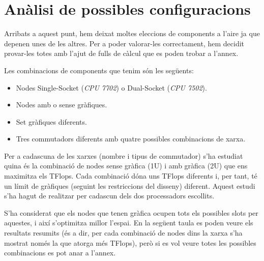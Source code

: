 \section{Anàlisi de possibles configuracions}

Arribats a aquest punt, hem deixat moltes eleccions de components a l'aire ja que depenen unes de les altres. Per a poder valorar-les correctament, hem decidit provar-les totes amb l'ajut de fulls de càlcul que es poden trobar a l'annex.

Les combinacions de components que tenim són les següents:
\begin{itemize}
    \item {Nodes Single-Socket (\textit{CPU 7702}) o Dual-Socket (\textit{CPU 7502})}.
    \item {Nodes amb o sense gràfiques}.
    \item {Set gràfiques diferents}.
    \item {Tres commutadors diferents amb quatre possibles combinacions de xarxa}.
\end{itemize}



Per a cadascuna de les xarxes (nombre i tipus de commutador) s'ha estudiat quina és la combinació de nodes sense gràfica (1U) i amb gràfica (2U) que ens maximitza els TFlops. Cada combinació dóna uns TFlops diferents i, per tant, té un límit de gràfiques (seguint les restriccions del disseny) diferent. Aquest estudi s'ha hagut de realitzar per cadascun dels dos processadors escollits.

S'ha considerat que els nodes que tenen gràfica ocupen tots els possibles slots per aquestes, i així s'optimitza millor l'espai. En la següent taula es poden veure els resultats resumits (és a dir, per cada combinació de nodes dins la xarxa s'ha mostrat només la que atorga més TFlops), però si es vol veure totes les possibles combinacions es pot anar a l'annex.

